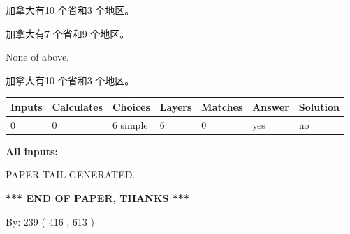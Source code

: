 \documentclass{ctexart}
\begin{document}
 
加拿大有10 个省和3 个地区。
 
 
加拿大有7 个省和9 个地区。
 
 
 None of above.
 
 
\noindent{}
 
 
加拿大有10 个省和3 个地区。
 
 
\noindent{}
 
 
   
   
   
   
\noindent\begin{tabular}{|l|l|l|l|l|l|l|}
 \hline
Inputs & Calculates & Choices & Layers & Matches & Answer & Solution \\ \hline
 0  & 
 0  & 
 6
  simple  
  & 
 6  & 
 0  & 
  yes & 
  no 
  \\ \hline
 \end{tabular}
   
   
   
   
\noindent{}
   
   
   
   
\noindent\vspace{0.1in}\hspace{-0.08in} {\textbf{\Large{All inputs: }}}
   
   
   
   
   
   
 \vspace{0.2in}
 
   
   
\vspace{2.0in} PAPER TAIL GENERATED.
   
   
   
   
\vspace{1.0in} 
{\textbf{\large{ *** END OF PAPER, THANKS *** }}} 
   
   
\hspace{1.0in} By: 
 239 ( 416 ,  613 )
   
   
   
   
\newpage 
\setcounter{page}{ 
   531001 } 
   
   
   
\end{document}
